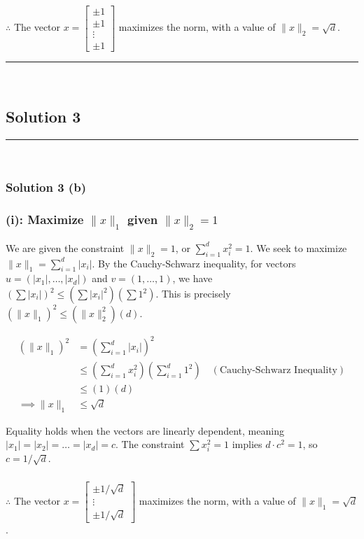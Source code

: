 \documentclass{article}
\begin{document}
\subsubsection*{\normalfont}{$\therefore$ The vector $x = \begin{bmatrix} \pm 1 \\ \pm 1 \\ \vdots \\ \pm 1 \end{bmatrix}$ maximizes the norm, with a value of $\|x\|_2 = \sqrt{d}$.}

\noindent\rule{\textwidth}{0.4pt}\\

\newpage

\subsection*{Solution 3}
\noindent\rule{\textwidth}{0.4pt}\\
\subsubsection*{Solution 3 (b)}
\subsubsection*{(i): Maximize $\|x\|_1$ given $\|x\|_{2}=1$}
\parbox{\textwidth}{
We are given the constraint $\|x\|_{2} = 1$, or $\sum_{i=1}^d x_i^2 = 1$. We seek to maximize $\|x\|_1 = \sum_{i=1}^d |x_i|$. By the Cauchy-Schwarz inequality, for vectors $u=(|x_1|, \dots, |x_d|)$ and $v=(1, \dots, 1)$, we have $(\sum |x_i|)^2 \le (\sum |x_i|^2)(\sum 1^2)$. This is precisely $(\|x\|_1)^2 \le (\|x\|_2^2)(d)$.
}
\begin{align*}
    (\|x\|_1)^2 &= \left(\sum_{i=1}^d |x_i|\right)^2 \\
    &\le \left(\sum_{i=1}^d x_i^2\right) \left(\sum_{i=1}^d 1^2\right) \quad (\text{Cauchy-Schwarz Inequality}) \\
    &\le (1)(d) \\
    \implies \|x\|_1 &\le \sqrt{d}
\end{align*}
\parbox{\textwidth}{
Equality holds when the vectors are linearly dependent, meaning $|x_1|=|x_2|=\dots=|x_d|=c$. The constraint $\sum x_i^2 = 1$ implies $d \cdot c^2 = 1$, so $c=1/\sqrt{d}$.
}
\subsubsection*{\normalfont}{$\therefore$ The vector $x = \begin{bmatrix} \pm 1/\sqrt{d} \\ \vdots \\ \pm 1/\sqrt{d} \end{bmatrix}$ maximizes the norm, with a value of $\|x\|_1 = \sqrt{d}$.}
\end{document}
